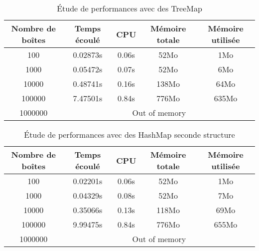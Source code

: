 \begin{table}[htbp]
  \centering
\begin{tabular}{|c|c|c|c|c|}
\hline
Nombre de boîtes & Temps écoulé & CPU & Mémoire totale & Mémoire utilisée\\
\hline
100 & 0.02873s & 0.06s & 52Mo & 1Mo\\
\hline
1000 & 0.05472s & 0.07s & 52Mo & 6Mo\\
\hline
10000 & 0.48741s & 0.16s & 138Mo & 64Mo\\
\hline
100000 & 7.47501s & 0.84s & 776Mo & 635Mo\\
\hline
1000000 & \multicolumn{4}{|c|}{Out of memory}\\
\hline
\end{tabular}
\caption{Étude de performances avec des TreeMap}
\label{tab:treemap1}
\end{table}


\begin{table}[htbp]
  \centering
\begin{tabular}{|c|c|c|c|c|}
\hline
Nombre de boîtes & Temps écoulé & CPU & Mémoire totale & Mémoire utilisée\\
\hline
100 & 0.02201s & 0.06s & 52Mo & 1Mo\\
\hline
1000 & 0.04329s & 0.08s & 52Mo & 7Mo\\
\hline
10000 & 0.35066s & 0.13s & 118Mo & 69Mo\\
\hline
100000 & 9.99475s & 0.84s & 776Mo & 655Mo\\
\hline
1000000 & \multicolumn{4}{|c|}{Out of memory}\\
\hline
\end{tabular}
\caption{Étude de performances avec des HashMap seconde structure}
\label{tab:hashmap3}
\end{table}



